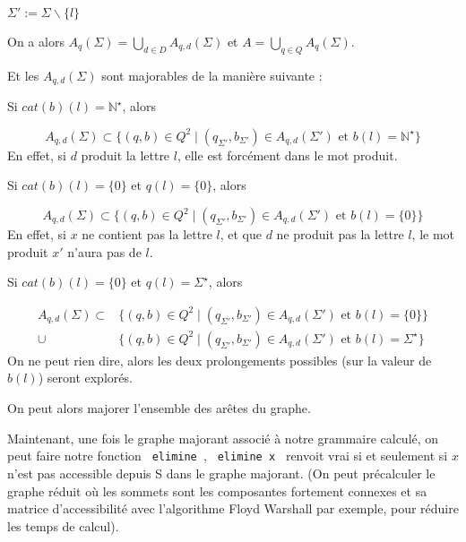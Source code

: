 \documentclass[a4paper,12pt]{article}
\newlength{\mydepth}
\newlength{\myheight}
\newenvironment{answer}
{\par\begin{lrbox}{\mybox}\quad\begin{minipage}{\linewidth}\color{black}\setlength{\parskip}{10pt plus 1pt minus 1pt}\vspace*{-.7\baselineskip}}
{\end{minipage}\end{lrbox}
\settodepth{\mydepth}{\usebox{\mybox}}
\settoheight{\myheight}{\usebox{\mybox}}
\addtolength{\myheight}{\mydepth}
\noindent\makebox[0pt]{
  \color{gray}\hspace{-0pt}\rule[-\mydepth]{1pt}{\myheight}}
  \usebox{\mybox}
  }
\begin{document}
\begin{answer} 
$\Sigma ' := \Sigma \backslash \{l\}$

On a alors $A_q(\Sigma) = \bigcup_{d \in D} A_{q,d}(\Sigma)$ et $A = \bigcup_{q \in Q} A_q(\Sigma)$.

Et les $A_{q,d}(\Sigma)$ sont majorables de la manière suivante : 


Si $cat(b)(l) = \mathbb{N}^\star$, alors
\begin{answer} 
\begin{equation*}A_{q,d}(\Sigma) \subset \{(q,b) \in Q^2 \mid (q_{\Sigma '},b_{\Sigma '}) \in A_{q,d}(\Sigma ') \text{ et } b(l) = \mathbb{N}^\star\}\end{equation*}
En effet, si $d$ produit la lettre $l$, elle est forcément dans le mot produit.
\end{answer}


Si $cat(b)(l) = \{0\}$ et $q(l) = \{0\}$, alors 
\begin{answer} 
\begin{equation*}A_{q,d}(\Sigma) \subset \{(q,b) \in Q^2 \mid (q_{\Sigma '},b_{\Sigma '}) \in A_{q,d}(\Sigma ') \text{ et } b(l) = \{0\}\}\end{equation*}
En effet, si $x$ ne contient pas la lettre $l$, et que $d$ ne produit pas la lettre $l$, le mot produit $x'$ n'aura pas de $l$.
\end{answer}


Si $cat(b)(l) = \{0\}$ et $q(l) = \Sigma^\star$, alors
\begin{answer} 
\begin{align*}
A_{q,d}(\Sigma) \subset &\{(q,b) \in Q^2 \mid (q_{\Sigma '},b_{\Sigma '}) \in A_{q,d}(\Sigma ') \text{ et } b(l) = \{0\}\} \\
\cup &\{(q,b) \in Q^2 \mid (q_{\Sigma '},b_{\Sigma '}) \in A_{q,d}(\Sigma ') \text{ et } b(l) = \Sigma^\star\}
\end{align*}
On ne peut rien dire, alors les deux prolongements possibles (sur la valeur de $b(l)$) seront explorés.
\end{answer}
\end{answer}

On peut alors majorer l'ensemble des arêtes du graphe.

Maintenant, une fois le graphe majorant associé à notre grammaire calculé, on peut faire notre fonction \texttt{ elimine },
 \texttt{ elimine x } renvoit vrai si et seulement si $x$ n'est pas accessible depuis S dans le graphe majorant.
 (On peut précalculer le graphe réduit où les sommets sont les composantes fortement connexes et sa matrice
 d'accessibilité avec l'algorithme Floyd Warshall par exemple, pour réduire les temps de calcul).
\end{document}
